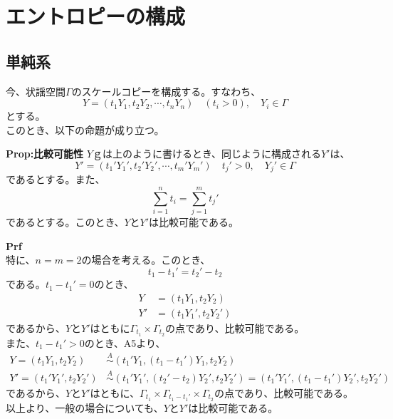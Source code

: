 \documentclass[a4paper,11pt]{jsarticle}
\numberwithin{equation}{section}
\begin{document}
\section{エントロピーの構成}
\subsection{単純系}
今、状謡空間$\Gamma$のスケールコピーを構成する。すなわち、
\begin{equation}
    Y =(t_1 Y_1,t_2 Y_2,\cdots,t_n Y_n) \quad (t_i>0), \quad Y_i \in \Gamma
\end{equation}
とする。\\
このとき、以下の命題が成り立つ。
\begin{itembox}[l]{\textbf{Prop:比較可能性}}
    $Y$ｇは上のように書けるとき、同じように構成される$Y'$は、
    \begin{equation}
        Y' =(t_1' Y_1',t_2' Y_2',\cdots,t_m' Y_m') \quad t_j'>0, \quad Y_j' \in \Gamma
    \end{equation}
    であるとする。また、
    \begin{equation}
        \sum_{i=1}^n t_i = \sum_{j=1}^m t_j'
    \end{equation}
    であるとする。このとき、$Y$と$Y'$は比較可能である。
\end{itembox}
\textbf{Prf}\\
特に、$n=m=2$の場合を考える。このとき、
\begin{equation}
    t_1-t_1' = t_2'-t_2
\end{equation}
である。$t_1-t_1' =0$のとき、
\begin{align}
    Y &= (t_1 Y_1,t_2 Y_2)\\
    Y' &= (t_1 Y_1',t_2 Y_2')
\end{align}
であるから、$Y$と$Y'$はともに$\Gamma _{t_1} \times \Gamma _{t_2}$の点であり、比較可能である。\\
また、$t_1-t_1' >0$のとき、A5より、
\begin{align}
    Y=(t_1 Y_1,t_2 Y_2) &\overset{A}{\sim} (t_1' Y_1,(t_1-t_1')Y_1,t_2 Y_2)\\
    Y'=(t_1' Y_1',t_2 Y_2') &\overset{A}{\sim} (t_1' Y_1',(t_2'-t_2)Y_2',t_2 Y_2')=(t_1' Y_1',(t_1-t_1')Y_2',t_2 Y_2')
\end{align}
であるから、$Y$と$Y'$はともに、$\Gamma _{t_1} \times \Gamma _{t_1-t_1'} \times \Gamma _{t_2}$の点であり、比較可能である。\\
以上より、一般の場合についても、$Y$と$Y'$は比較可能である。\hfill\qedsymbol\\
\end{document}
